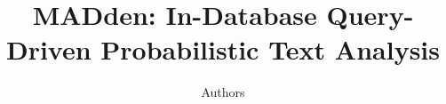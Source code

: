 \documentclass{acm_proc_article-sp}
\newcommand{\system}{MADden}
\begin{document}
\title{\system: In-Database Query-Driven Probabilistic Text Analysis}

\author{Authors}

\maketitle















%



\end{document}
